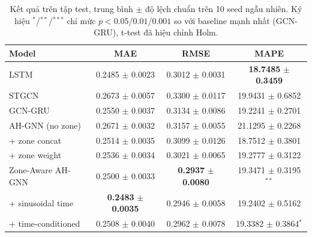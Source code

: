 \begin{table}[t]
\centering
\caption{Kết quả trên tập test, trung bình $\pm$ độ lệch chuẩn trên 10 seed ngẫu nhiên. Ký hiệu $^{*}$/$^{**}$/$^{***}$ chỉ mức $p<0.05$/$0.01$/$0.001$ so với baseline mạnh nhất (GCN-GRU), t-test đã hiệu chỉnh Holm.}
\label{tab:main-results-chrono}
\begin{tabular}{lccc}
\toprule
Model & MAE & RMSE & MAPE \\
\midrule
LSTM & 0.2485 $\pm$ 0.0023 & 0.3012 $\pm$ 0.0031 & \textbf{18.7485} $\pm$ \textbf{0.3459} \\
STGCN & 0.2673 $\pm$ 0.0057 & 0.3300 $\pm$ 0.0117 & 19.9431 $\pm$ 0.6852 \\
GCN-GRU & 0.2550 $\pm$ 0.0037 & 0.3134 $\pm$ 0.0086 & 19.2241 $\pm$ 0.2701 \\
AH-GNN (no zone) & 0.2671 $\pm$ 0.0032 & 0.3157 $\pm$ 0.0055 & 21.1295 $\pm$ 0.2268 \\
\; + zone concat & 0.2514 $\pm$ 0.0035 & 0.3099 $\pm$ 0.0126 & 18.7512 $\pm$ 0.3801 \\
\; + zone weight & 0.2536 $\pm$ 0.0034 & 0.3021 $\pm$ 0.0065 & 19.2777 $\pm$ 0.3122 \\
Zone-Aware AH-GNN & 0.2500 $\pm$ 0.0033 & \textbf{0.2937} $\pm$ \textbf{0.0080} & 19.3471 $\pm$ 0.3195$^{**}$ \\
\; + sinusoidal time & \textbf{0.2483} $\pm$ \textbf{0.0035} & 0.2946 $\pm$ 0.0058 & 19.2402 $\pm$ 0.5162 \\
\; + time-conditioned & 0.2508 $\pm$ 0.0040 & 0.2962 $\pm$ 0.0078 & 19.3382 $\pm$ 0.3864$^{*}$ \\
\bottomrule
\end{tabular}
\end{table}

